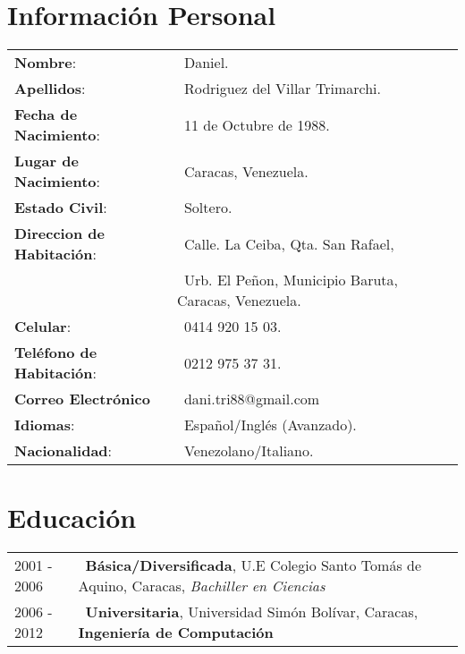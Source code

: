 \documentclass[10pt,a4paper]{moderncv}
\begin{document}
\maketitle

\section{Informaci\'on Personal}
	\begin{tabular}{l  l}
		\textbf{Nombre}:    		    	        & \ Daniel. \\
		\textbf{Apellidos}: 		      	      & \ Rodriguez del Villar 
                                              Trimarchi. \\
		\textbf{Fecha de Nacimiento}:         & \ 11 de Octubre de 1988. \\
		\textbf{Lugar de Nacimiento}:         & \ Caracas, Venezuela. \\
		\textbf{Estado Civil}: 		      	    & \ Soltero. \\
		\textbf{Direccion de Habitaci\'on}:   & \ Calle. La Ceiba, Qta. San 
                                              Rafael, \\
                                          & \ Urb. El Peñon, Municipio Baruta, 
                                              Caracas, Venezuela. \\
		\textbf{Celular}: 				  	        & \ 0414 920 15 03. \\
		\textbf{Tel\'efono de Habitaci\'on}:  & \ 0212 975 37 31. \\
        \textbf{Correo Electr\'onico}         & \ dani.tri88@gmail.com \\
		\textbf{Idiomas}:                 	  & \ Español/Ingl\'es (Avanzado). \\
		\textbf{Nacionalidad}:                & \ Venezolano/Italiano. \\
	\end{tabular}

\section{Educaci\'on}
	\begin{tabular}{l l}
		2001 - 2006   & \ \textbf{B\'asica/Diversificada}, U.E Colegio Santo 
                       Tom\'as de Aquino, Caracas, \textit{Bachiller en 
                       Ciencias} \\  
		2006 - 2012   & \ \textbf{Universitaria}, Universidad Sim\'on Bol\'ivar, 
                       Caracas, \textbf{Ingenier\'ia de Computaci\'on}\\
	\end{tabular}
	
\end{document}
